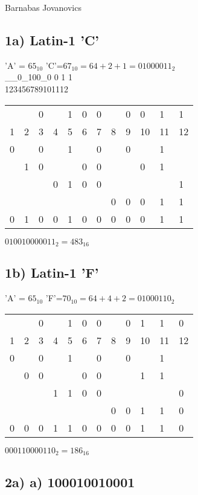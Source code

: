 \documentclass[]{article}
\date{}
\begin{document}
Barnabas Jovanovics

\subsection{1a) Latin-1 'C'}\label{a-14}

'A' = $65_{10}$ 'C'=$67_{10} = 64 + 2 + 1 = 01000011_{2}$\\

\_\_0\_100\_0 0 1 1\\
123456789101112

\begin{longtable}[l]{@{}llllllllllll@{}}
	\toprule
	 & &0& &1&0&0& &0& 0& 1& 1\\
	1&2&3&4&5&6&7&8&9&10&11&12\\
	\midrule
	0& &0& &1& &0& &0&  & 1&  \\
	 &1&0& & &0&0& & & 0& 1&  \\
	 & & &0&1&0&0& & &  &  & 1\\
	 & & & & & & &0&0& 0& 1& 1\\ 
	\hline
	0&1&0&0&1&0&0&0&0& 0& 1& 1\\
	\endhead
	\bottomrule
\end{longtable}

$010010000011_{2} = 483_{16}$

\subsection{1b) Latin-1 'F'}\label{a-14}

'A' = $65_{10}$ 'F'=$70_{10} = 64 + 4 + 2 = 01000110_{2}$\\

\begin{longtable}[l]{@{}llllllllllll@{}}
	\toprule
	 & &0& &1&0&0& &0& 1& 1& 0\\
	1&2&3&4&5&6&7&8&9&10&11&12\\
	\midrule
	0& &0& &1& &0& &0&  & 1&  \\
	 &0&0& & &0&0& & & 1& 1&  \\
	 & & &1&1&0&0& & &  &  & 0\\
	 & & & & & & &0&0& 1& 1& 0\\ 
	\hline
	0&0&0&1&1&0&0&0&0& 1& 1&0\\
	\endhead
	\bottomrule
\end{longtable}

$000110000110_{2} = 186_{16}$

\pagebreak

\subsection{2a) a) 100010010001 }\label{b-1332}
\end{document}
